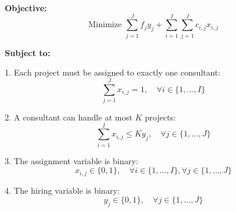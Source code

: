 \documentclass{article}
\begin{document}
\textbf{Objective:}
\[
\text{Minimize } \sum_{j=1}^{J} f_j y_j + \sum_{i=1}^{I} \sum_{j=1}^{J} c_{i,j} x_{i,j}
\]

\textbf{Subject to:}

1. Each project must be assigned to exactly one consultant:
\[
\sum_{j=1}^{J} x_{i,j} = 1, \quad \forall i \in \{1, \ldots, I\}
\]

2. A consultant can handle at most \( K \) projects:
\[
\sum_{i=1}^{I} x_{i,j} \leq K y_j, \quad \forall j \in \{1, \ldots, J\}
\]

3. The assignment variable is binary:
\[
x_{i,j} \in \{0, 1\}, \quad \forall i \in \{1, \ldots, I\}, \forall j \in \{1, \ldots, J\}
\]

4. The hiring variable is binary:
\[
y_j \in \{0, 1\}, \quad \forall j \in \{1, \ldots, J\}
\]
\end{document}
